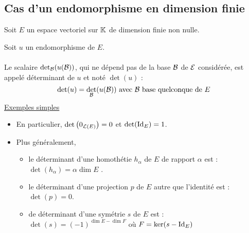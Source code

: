 \subsection{Cas d’un endomorphisme en dimension finie}
    Soit \(E\) un espace vectoriel sur \(\K\) de dimension finie non nulle.
\begin{theo}
    Soit \(u\) un endomorphisme de \(E\).\\~\\
    Le scalaire \(\det_{\cal{B}} (u(\cal{B}))\), qui ne dépend pas de la base \(\cal{B}\) de \(\cal{E}\) considérée, est appelé déterminant de \(u\) et noté \(\det(u)\) :
    \[\det (u) = \det_{\cal{B}} (u(\cal{B})) \text{ avec }\cal{B} \text{ base quelconque de } E\]
    \underline{Exemples simples}\\
    \begin{itemize}
        \item En particulier, \( \det\paren{ 0_{\cal{L}(E)}} = 0\) et \(\det (\id{E} ) = 1\).
        \item Plus généralement,
        \begin{itemize}
            \item le déterminant d’une homothétie \(h_\alpha\)  de \(E\) de rapport \(\alpha\)  est : \(\det (h_{\alpha} ) = \alpha  \dim E\) .
            \item le déterminant d’une projection \(p\) de \(E\) autre que l’identité est : \(\det (p) = 0\).
            \item de déterminant d’une symétrie \(s\) de \(E\) est : \(\det (s) = (-1)^{\dim E-\dim F}\) où \( F = \ker(s - \id{E} )\)
        \end{itemize}
    \end{itemize}
\end{theo}
